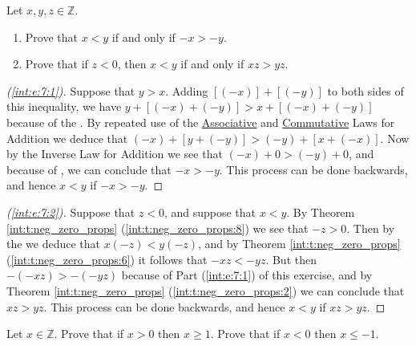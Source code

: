 \Newpage
\begin{exercise} %
	\label{int:e:7}
	Let $x, y, z \in \mathbb{Z}$.
	\begin{enumerate}
		\item \label{int:e:7:1}
		      Prove that $x < y$ if and only if $ -x > -y$.
		\item \label{int:e:7:2}
		      Prove that if $z < 0$, then $x < y$ if and only if $x z > y z$.
	\end{enumerate}
\end{exercise}

\begin{proof}[(\ref{int:e:7:1})]
	Suppose that $y > x$. Adding $[(-x)] + [(-y)]$ to both sides of this inequality, we have $y + [(-x) + (-y)] > x + [(-x) + (-y)]$ because of the . By repeated use of the \hyperref[int:t:props:associative_add]{Associative} and \hyperref[int:t:props:commutative_add]{Commutative} Laws for Addition we deduce that ${(-x) + [y + (-y)] > (-y) + [x + (-x)]}$. Now by the Inverse Law for Addition we see that $(-x) + 0 > (-y) + 0$, and because of , we  can conclude that $-x > -y$. This process can be done backwards, and hence $x < y$ if $-x > -y$.
\end{proof}

\begin{proof}[(\ref{int:e:7:2})]
	Suppose that $z < 0$, and suppose that $x < y$. By Theorem \ref{int:t:neg_zero_props} (\ref{int:t:neg_zero_props:8}) we see that $-z > 0$. Then by the  we deduce that $x(-z) < y(-z)$, and by Theorem \ref{int:t:neg_zero_props} (\ref{int:t:neg_zero_props:6}) it follows that $-xz < -yz$. But then $-(-xz) > -(-yz)$ because of Part (\ref{int:e:7:1}) of this exercise, and by Theorem \ref{int:t:neg_zero_props} (\ref{int:t:neg_zero_props:2}) we can conclude that $xz > yz$. This process can be done backwards, and hence $x < y$ if $xz > yz$.
\end{proof}

\Newpage
\begin{exercise} %
	\label{int:e:8}
	Let $x \in \mathbb{Z}$. Prove that if $x > 0$ then $x \geq 1$. Prove that if $x < 0$ then $x \leq -1$.
\end{exercise}

